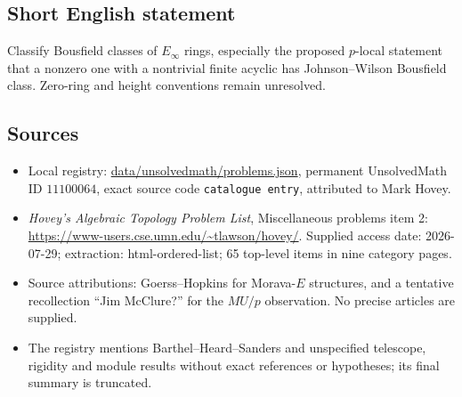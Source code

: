\documentclass[11pt]{article}
\begin{document}
\subsection{Short English statement}
Classify Bousfield classes of $E_\infty$ rings, especially the proposed $p$-local statement that a nonzero one with a nontrivial finite acyclic has Johnson--Wilson Bousfield class. Zero-ring and height conventions remain unresolved.
\subsection{Sources}
\begin{itemize}
\item Local registry: \url{data/unsolvedmath/problems.json}, permanent UnsolvedMath ID $11100064$, exact source code \texttt{catalogue entry}, attributed to Mark Hovey.
\item \emph{Hovey's Algebraic Topology Problem List}, Miscellaneous problems item 2: \url{https://www-users.cse.umn.edu/~tlawson/hovey/}. Supplied access date: 2026-07-29; extraction: html-ordered-list; 65 top-level items in nine category pages.
\item Source attributions: Goerss--Hopkins for Morava-$E$ structures, and a tentative recollection ``Jim McClure?'' for the $MU/p$ observation. No precise articles are supplied.
\item The registry mentions Barthel--Heard--Sanders and unspecified telescope, rigidity and module results without exact references or hypotheses; its final summary is truncated.
\end{itemize}
\end{document}
